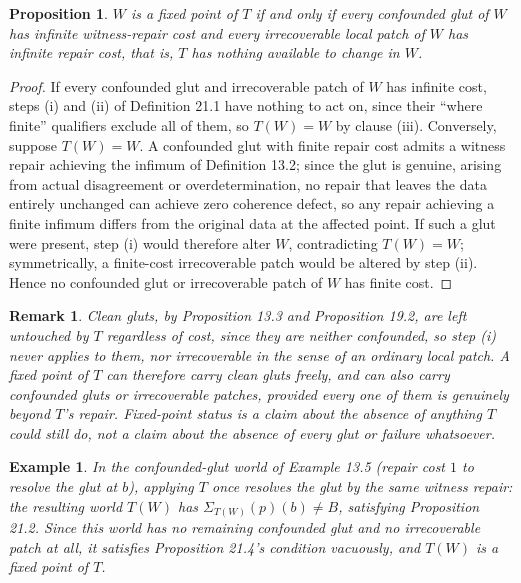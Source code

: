 \documentclass[11pt]{book}
\newtheorem{proposition}[theorem]{Proposition}
\newtheorem{remark}[theorem]{Remark}
\newtheorem{example}[theorem]{Example}
\begin{document}
\begin{proposition}
$W$ is a fixed point of $T$ if and only if every confounded glut of $W$ has infinite witness-repair cost and every irrecoverable local patch of $W$ has infinite repair cost, that is, $T$ has nothing available to change in $W$.
\end{proposition}

\begin{proof}
If every confounded glut and irrecoverable patch of $W$ has infinite cost, steps (i) and (ii) of Definition 21.1 have nothing to act on, since their ``where finite'' qualifiers exclude all of them, so $T(W) = W$ by clause (iii). Conversely, suppose $T(W) = W$. A confounded glut with finite repair cost admits a witness repair achieving the infimum of Definition 13.2; since the glut is genuine, arising from actual disagreement or overdetermination, no repair that leaves the data entirely unchanged can achieve zero coherence defect, so any repair achieving a finite infimum differs from the original data at the affected point. If such a glut were present, step (i) would therefore alter $W$, contradicting $T(W)=W$; symmetrically, a finite-cost irrecoverable patch would be altered by step (ii). Hence no confounded glut or irrecoverable patch of $W$ has finite cost.
\end{proof}

\begin{remark}
Clean gluts, by Proposition 13.3 and Proposition 19.2, are left untouched by $T$ regardless of cost, since they are neither confounded, so step (i) never applies to them, nor irrecoverable in the sense of an ordinary local patch. A fixed point of $T$ can therefore carry clean gluts freely, and can also carry confounded gluts or irrecoverable patches, provided every one of them is genuinely beyond $T$'s repair. Fixed-point status is a claim about the absence of anything $T$ could still do, not a claim about the absence of every glut or failure whatsoever.
\end{remark}

\begin{example}
In the confounded-glut world of Example 13.5 (repair cost $1$ to resolve the glut at $b$), applying $T$ once resolves the glut by the same witness repair: the resulting world $T(W)$ has $\Sigma_{T(W)}(p)(b) \neq B$, satisfying Proposition 21.2. Since this world has no remaining confounded glut and no irrecoverable patch at all, it satisfies Proposition 21.4's condition vacuously, and $T(W)$ is a fixed point of $T$.
\end{example}
\end{document}
